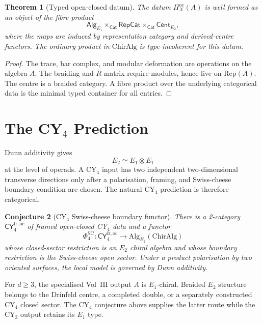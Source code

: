 \documentclass[11pt]{article}
\newtheorem{theorem}{Theorem}
\newtheorem{conjecture}[theorem]{Conjecture}
\providecommand{\Eone}{E_1}
\providecommand{\Etwo}{E_2}
\providecommand{\ChirAlg}{\mathrm{ChirAlg}}
\providecommand{\Rep}{\mathrm{Rep}}
\begin{document}
\begin{theorem}[Typed open-closed datum]
\label{thm:typed-open-closed-datum}
The datum $\Pi_X^{\mathrm{oc}}(A)$ is well formed as an object of the
fibre product
\[
  \mathsf{Alg}_{\Eone}
  \times_{\mathsf{Cat}}
  \mathsf{RepCat}
  \times_{\mathsf{Cat}}
  \mathsf{Cent}_{\Etwo},
\]
where the maps are induced by representation category and derived-centre
functors. The ordinary product in $\ChirAlg$ is type-incoherent for
this datum.
\end{theorem}

\begin{proof}
The trace, bar complex, and modular deformation are operations on the
algebra $A$. The braiding and $R$-matrix require modules, hence live on
$\Rep(A)$. The centre is a braided category. A fibre product over the
underlying categorical data is the minimal typed container for all
entries.
\end{proof}

\section{The CY$_4$ Prediction}

Dunn additivity gives
\[
  \Etwo\simeq \Eone\otimes\Eone
\]
at the level of operads. A CY$_4$ input has two independent
two-dimensional transverse directions only after a polarisation,
framing, and Swiss-cheese boundary condition are chosen. The natural
CY$_4$ prediction is therefore categorical.

\begin{conjecture}[CY$_4$ Swiss-cheese boundary functor]
\label{conj:cy4-swiss-cheese-boundary}
There is a 2-category $\mathsf{CY}_4^{\mathrm{fr,oc}}$ of framed
open-closed CY$_4$ data and a functor
\[
  \Phi_4^{\mathrm{SC}}:
  \mathsf{CY}_4^{\mathrm{fr,oc}}
  \longrightarrow
  \mathrm{Alg}_{\Etwo}(\ChirAlg)
\]
whose closed-sector restriction is an $\Etwo$ chiral algebra and whose
boundary restriction is the Swiss-cheese open sector. Under a product
polarisation by two oriented surfaces, the local model is governed by
Dunn additivity.
\end{conjecture}

\begin{remark}
For $d\ge3$, the specialised Vol~III output $A$ is $\Eone$-chiral.
Braided $\Etwo$ structure belongs to the Drinfeld centre, a completed
double, or a separately constructed CY$_4$ closed sector. The CY$_4$
conjecture above supplies the latter route while the CY$_3$ output
retains its $\Eone$ type.
\end{remark}
\end{document}
